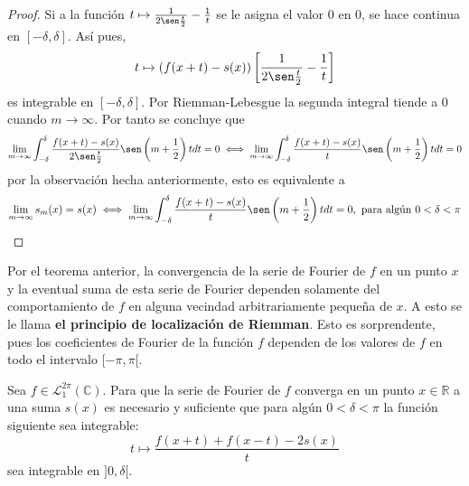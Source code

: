 \documentclass[12pt]{report}
\theoremstyle{largebreak}
\begin{document}
\begin{proof}
        Si a la función $t\mapsto\frac{1}{2\sen\frac{t}{2}}-\frac{1}{t}$ se le asigna el valor 0 en 0, se hace continua en $[-\delta,\delta]$. Así pues,
        \begin{equation*}
            t\mapsto\left(f(x+t)-s(x) \right)\left[\frac{1}{2\sen\frac{t}{2}}-\frac{1}{t}\right]
        \end{equation*}
        es integrable en $[-\delta,\delta]$. Por Riemman-Lebesgue la segunda integral tiende a 0 cuando $m\rightarrow\infty$. Por tanto se concluye que
        \begin{equation*}
            \lim_{ m\rightarrow\infty}\int_{-\delta}^{\delta}\frac{f(x+t)-s(x)}{2\sen\frac{t}{2}}\sen\left(m+\frac{1}{2} \right)tdt=0\iff\lim_{ m\rightarrow\infty}\int_{-\delta}^{\delta}\frac{f(x+t)-s(x)}{t}\sen\left(m+\frac{1}{2} \right)tdt=0
        \end{equation*}
        por la observación hecha anteriormente, esto es equivalente a
        \begin{equation*}
            \lim_{ m\rightarrow\infty}s_m(x)=s(x)\iff\lim_{ m\rightarrow\infty}\int_{-\delta}^{\delta}\frac{f(x+t)-s(x)}{t}\sen\left(m+\frac{1}{2} \right)tdt=0,\textup{ para algún }0<\delta<\pi
        \end{equation*}
    \end{proof}

    \begin{obs}
        Por el teorema anterior, la convergencia de la serie de Fourier de $f$ en un punto $x$ y la eventual suma de esta serie de Fourier dependen solamente del comportamiento de $f$ en alguna vecindad arbitrariamente pequeña de $x$. A esto se le llama \textbf{el principio de localización de Riemman}. Esto es sorprendente, pues los coeficientes de Fourier de la función $f$ dependen de los valores de $f$ en todo el intervalo $[-\pi,\pi[$.
    \end{obs}

    \begin{theor}
        Sea $f\in\mathcal{L}_1^{2\pi}(\mathbb{C})$. Para que la serie de Fourier de $f$ converga en un punto $x\in\mathbb{R}$ a una suma $s(x)$ es necesario y suficiente que para algún $0<\delta<\pi$ la función siguiente sea integrable:
        \begin{equation*}
            t\mapsto\frac{f(x+t)+f(x-t)-2s(x)}{t}
        \end{equation*}
        sea integrable en $]0,\delta[$.
    \end{theor}
\end{document}

